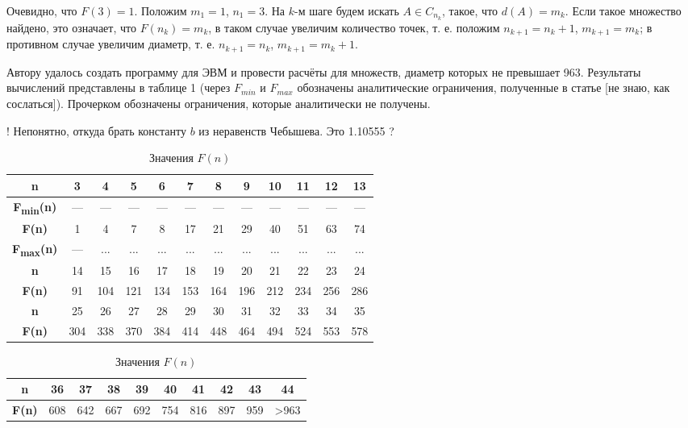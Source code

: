 \documentclass{article}
\begin{document}
Очевидно, что $F(3) = 1$.
Положим $m_1=1$, $n_1=3$.
На $k$-м шаге будем искать $A \in C_{n_k}$, такое, что $d(A) = m_k$.
Если такое множество найдено, это означает, что $F(n_k)=m_k$,
в таком случае увеличим количество точек, т. е. положим $n_{k+1} = n_k +1$, $m_{k+1} = m_k$;
в противном случае увеличим диаметр, т. е. $n_{k+1} = n_k$, $m_{k+1} = m_k +1$.



Автору удалось создать программу для ЭВМ и провести расчёты для множеств, диаметр которых не превышает 963.
Результаты вычислений представлены в таблице 1 (через $F_{min}$ и $F_{max}$ обозначены аналитические ограничения, полученные в статье [не знаю, как сослаться]).
Прочерком обозначены ограничения, которые аналитически не получены.

! Непонятно, откуда брать константу $b$ из неравенств Чебышева. Это 1.10555 ?


\begin{table}[H]
\caption{Значения $F(n)$}
\label{tabular:pc_counted}
\begin{center}
\begin{tabular}{|c|c|c|c|c|c|c|c|c|c|c|c|}
\hline
\textbf{n}    &  3 & 4 & 5 & 6 &  7 &  8 &  9 & 10 & 11 & 12 & 13 \\
\hline
\textbf{F\textsubscript{min}(n)} &  --- & --- & --- & --- & --- & --- & --- & --- & --- & --- & ---  \\
\hline
\textbf{F(n)} &  1 & 4 & 7 & 8 & 17 & 21 & 29 & 40 & 51 & 63 & 74  \\
\hline
\textbf{F\textsubscript{max}(n)} &  --- & ... & ... & ... & ... & ... & ... & ... & ... & ... & ...  \\
\hline
\hline
\textbf{n}    &  14 &  15 &  16 &  17 &  18 &  19 &  20 &  21 &  22 &  23 &  24 \\
\hline
\textbf{F(n)} &  91 & 104 & 121 & 134 & 153 & 164 & 196 & 212 & 234 & 256 & 286  \\
\hline
\hline
\textbf{n}    &  25 &  26 &  27 &  28 &  29 &  30 &  31 &  32 &  33 &  34 &  35 \\
\hline
\textbf{F(n)} & 304 & 338 & 370 & 384 & 414 & 448 & 464 & 494 & 524 & 553 & 578  \\
\hline
\end{tabular}
\begin{tabular}{|c|c|c|c|c|c|c|c|c|c|}
\hline
\textbf{n}    &  36 &  37 &  38 &  39 &  40 &  41 &  42 &  43 & 44 \\

\hline
\textbf{F(n)} & 608 & 642 & 667 & 692 & 754 & 816 & 897 & 959 & >963 \\
\hline
\end{tabular}
\end{center}
\end{table}
\end{document}

